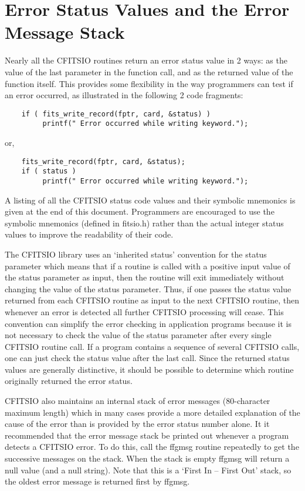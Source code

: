 \section{Error Status Values and the Error Message Stack}

Nearly all the CFITSIO routines return an error status value
in 2 ways: as the value of the last parameter in the function call,
and as the returned value of the function itself.  This provides
some flexibility in the way programmers can test if an error
occurred, as illustrated in the following 2 code fragments:

\begin{verbatim}
    if ( fits_write_record(fptr, card, &status) )
         printf(" Error occurred while writing keyword.");
\end{verbatim}
or,

\begin{verbatim}
    fits_write_record(fptr, card, &status);
    if ( status )
         printf(" Error occurred while writing keyword.");
\end{verbatim}
A listing of all the CFITSIO status code values and their symbolic
mnemonics is given at the end of this document.  Programmers are
encouraged to use the symbolic  mnemonics (defined in fitsio.h) rather
than the actual integer status values to improve the readability of
their code.

The CFITSIO library uses an `inherited status' convention for the
status parameter which means that if a routine is called with a
positive input value of the status parameter as input, then the routine
will exit immediately without changing the value of the status
parameter.  Thus, if one passes the status value returned from each
CFITSIO routine as input to the next CFITSIO routine, then whenever an
error is detected all further CFITSIO processing will cease.  This
convention can simplify the error checking in application programs
because it is not necessary to check the value of the status parameter
after every single CFITSIO routine call.  If a program contains a
sequence of several CFITSIO calls, one can just check the status value
after the last call.  Since the returned status values are generally
distinctive, it should be possible to determine which routine
originally returned the error status.

CFITSIO also maintains an internal stack of error messages
(80-character maximum length)  which in many cases provide a more
detailed explanation of the cause of the error than is provided by the
error status number alone.  It it recommended that the error message
stack be printed out whenever a program detects a CFITSIO error.  To do
this, call the ffgmsg routine repeatedly to get the successive messages
on the stack.  When the stack is empty ffgmsg will return a null value
(and a null string).  Note that this is a `First In -- First Out'
stack, so the oldest error message is returned first by ffgmsg.

